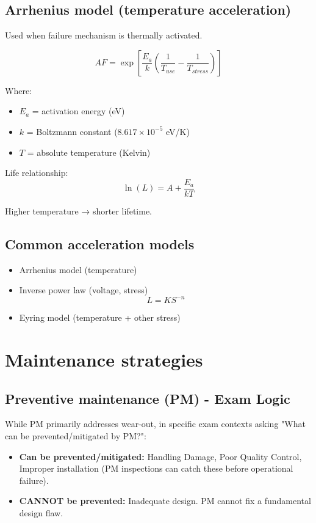 \documentclass[10pt,a4paper,twocolumn]{article}
\begin{document}
\subsection*{Arrhenius model (temperature acceleration)}

Used when failure mechanism is thermally activated.

\[AF =\exp\left[ \frac{E_a}{k} \left(\frac{1}{T_{use}} - \frac{1}{T_{stress}} \right) \right]\]

Where:
\begin{itemize}
\item $E_a$ = activation energy (eV)
\item $k$ = Boltzmann constant ($8.617\times10^{-5}$ eV/K)
\item $T$ = absolute temperature (Kelvin)
\end{itemize}

Life relationship:
\[\ln(L) = A + \frac{E_a}{kT}\]

Higher temperature → shorter lifetime.

\subsection*{Common acceleration models}

\begin{itemize}
\item Arrhenius model (temperature)
\item Inverse power law (voltage, stress)
\[L = K S^{-n}\]
\item Eyring model (temperature + other stress)
\end{itemize}

\section*{Maintenance strategies}

\subsection*{Preventive maintenance (PM) - Exam Logic}

While PM primarily addresses wear-out, in specific exam contexts asking "What can be prevented/mitigated by PM?":
\begin{itemize}[leftmargin=*,itemsep=0pt]
\item \textbf{Can be prevented/mitigated:} Handling Damage, Poor Quality Control, Improper installation (PM inspections can catch these before operational failure).
\item \textbf{CANNOT be prevented:} Inadequate design. PM cannot fix a fundamental design flaw.
\end{itemize}
\end{document}
